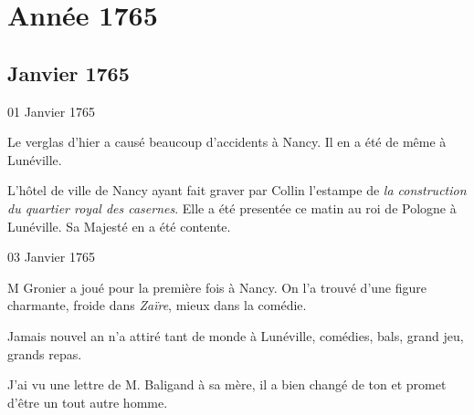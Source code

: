 
               \part*{Année 1765}\chapter*{Janvier 1765}



                     \begin{diary}{01 Janvier 1765}{}

                         Le verglas d'hier a causé beaucoup d'accidents
                           à Nancy. Il en a été de même
                           à Lunéville. \bigskip



                           L'hôtel de ville de Nancy
                           ayant fait graver par
                           Collin l'estampe de \emph{la construction du quartier
                              royal des casernes}.
                           Elle a été presentée ce matin
                           au roi de Pologne à
                              Lunéville. Sa Majesté en a été contente. \bigskip


                     \end{diary}

                     \begin{diary}{03 Janvier 1765}{}


                           M
                              Gronier a joué pour la première fois à
                           Nancy. On l'a trouvé d'une
                           figure charmante,
                           froide dans \emph{Zaïre}, mieux dans la
                           comédie. \bigskip


                         Jamais nouvel an n'a attiré tant de
                           monde à
                           Lunéville, comédies,
                           bals, grand jeu, grands repas. \bigskip


                         J'ai vu une lettre de M. Baligand à sa mère,
                           il a bien changé de ton et promet d'être un
                           tout autre homme. \bigskip


                     \end{diary}

